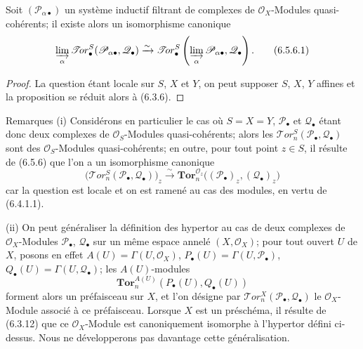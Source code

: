 \begin{proposition}[6.5.6]
Soit $(\mathscr P_{\alpha\bullet})$ un système inductif filtrant de complexes
de $\mathscr O_X$-Modules quasi-cohérents; il existe alors un isomorphisme
canonique
\[
  \varinjlim_\alpha
  \mathscr{T}\!or_\bullet^S
  (\mathscr P_{\alpha\bullet},\mathscr Q_\bullet)
  \xrightarrow{\sim}
  \mathscr{T}\!or_\bullet^S
  \left(\varinjlim_\alpha\mathscr P_{\alpha\bullet},\mathscr Q_\bullet\right).
  \tag{6.5.6.1}\label{III.6.5.6.1.fr}
\]
\end{proposition}

\begin{proof}
La question étant locale sur $S$, $X$ et $Y$, on peut supposer $S$, $X$, $Y$
affines et la proposition se réduit alors à (6.3.6).
\end{proof}

\begin{namedtheorem}[6.5.7]{Remarques}
\textnormal{(i)} Considérons en particulier le cas où $S=X=Y$,
$\mathscr P_\bullet$ et $\mathscr Q_\bullet$ étant donc deux complexes de
$\mathscr O_S$-Modules quasi-cohérents; alors les
$\mathscr{T}\!or_n^S(\mathscr P_\bullet,\mathscr Q_\bullet)$ sont des
$\mathscr O_S$-Modules quasi-cohérents; en outre, pour tout point $z\in S$, il
résulte de (6.5.6) que l'on a un isomorphisme canonique
\[
  \bigl(\mathscr{T}\!or_n^S
    (\mathscr P_\bullet,\mathscr Q_\bullet)\bigr)_z
  \xrightarrow{\sim}
  \mathbf{Tor}_n^{\mathscr O_z}
  \bigl((\mathscr P_\bullet)_z,(\mathscr Q_\bullet)_z\bigr)
  \tag{6.5.7.1}\label{III.6.5.7.1.fr}
\]
car la question est locale et on est ramené au cas des modules, en vertu de
(6.4.1.1).

\textnormal{(ii)} On peut généraliser la définition des hypertor au cas de
deux complexes de $\mathscr O_X$-Modules $\mathscr P_\bullet$,
$\mathscr Q_\bullet$ sur un même espace annelé $(X,\mathscr O_X)$; pour tout
ouvert $U$ de $X$, posons en effet
$A(U)=\Gamma(U,\mathscr O_X)$,
$P_\bullet(U)=\Gamma(U,\mathscr P_\bullet)$,
$Q_\bullet(U)=\Gamma(U,\mathscr Q_\bullet)$; les $A(U)$-modules
\[
  \mathbf{Tor}_n^{A(U)}(P_\bullet(U),Q_\bullet(U))
\]
forment alors un préfaisceau sur $X$, et l'on désigne par
$\mathscr{T}\!or_n^X(\mathscr P_\bullet,\mathscr Q_\bullet)$ le
$\mathscr O_X$-Module associé à ce préfaisceau. Lorsque $X$ est un préschéma,
il résulte de (6.3.12) que ce $\mathscr O_X$-Module est canoniquement isomorphe
à l'hypertor défini ci-dessus. Nous ne développerons pas davantage cette
généralisation.
\end{namedtheorem}

